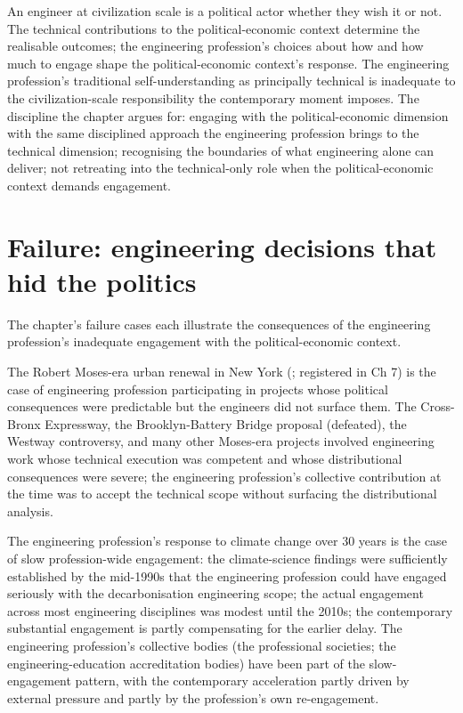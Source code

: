 \begin{principle}
An engineer at civilization scale is a political actor whether they wish it or not. The technical contributions to the political-economic context determine the realisable outcomes; the engineering profession's choices about how and how much to engage shape the political-economic context's response. The engineering profession's traditional self-understanding as principally technical is inadequate to the civilization-scale responsibility the contemporary moment imposes. The discipline the chapter argues for: engaging with the political-economic dimension with the same disciplined approach the engineering profession brings to the technical dimension; recognising the boundaries of what engineering alone can deliver; not retreating into the technical-only role when the political-economic context demands engagement.
\end{principle}

\section{Failure: engineering decisions that hid the politics}

The chapter's failure cases each illustrate the consequences of the engineering profession's inadequate engagement with the political-economic context.

The Robert Moses-era urban renewal in New York (\cite{hist:caro-powerbroker-1974}; registered in Ch 7) is the case of engineering profession participating in projects whose political consequences were predictable but the engineers did not surface them. The Cross-Bronx Expressway, the Brooklyn-Battery Bridge proposal (defeated), the Westway controversy, and many other Moses-era projects involved engineering work whose technical execution was competent and whose distributional consequences were severe; the engineering profession's collective contribution at the time was to accept the technical scope without surfacing the distributional analysis.

The engineering profession's response to climate change over $30$ years \cite{paper:franta-engineering-climate-2018} is the case of slow profession-wide engagement: the climate-science findings were sufficiently established by the mid-1990s that the engineering profession could have engaged seriously with the decarbonisation engineering scope; the actual engagement across most engineering disciplines was modest until the 2010s; the contemporary substantial engagement is partly compensating for the earlier delay. The engineering profession's collective bodies (the professional societies; the engineering-education accreditation bodies) have been part of the slow-engagement pattern, with the contemporary acceleration partly driven by external pressure and partly by the profession's own re-engagement.

